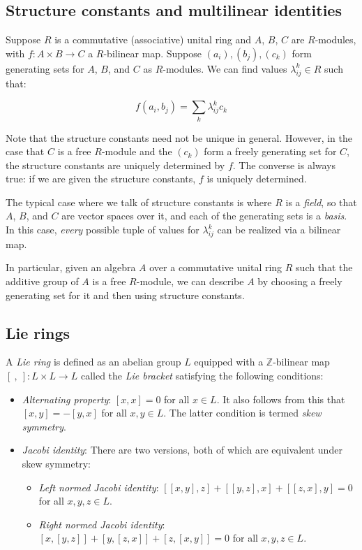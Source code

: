 \documentclass{ucetd}
\begin{document}
\subsection{Structure constants and multilinear identities}

Suppose $R$ is a commutative (associative) unital ring and $A$, $B$,
$C$ are $R$-modules, with $f:A \times B \to C$ a $R$-bilinear
map. Suppose $(a_i), (b_j),(c_k)$ form generating sets for $A$, $B$,
and $C$ as $R$-modules. We can find values $\lambda_{ij}^k \in R$ such that:

$$f(a_i,b_j) = \sum_k \lambda_{ij}^k c_k$$

Note that the structure constants need not be unique in
general. However, in the case that $C$ is a free $R$-module and the
$(c_k)$ form a freely generating set for $C$, the structure constants
are uniquely determined by $f$. The converse is always true: if we are
given the structure constants, $f$ is uniquely determined.

The typical case where we talk of structure constants is where $R$ is
a {\em field}, so that $A$, $B$, and $C$ are vector spaces over it,
and each of the generating sets is a {\em basis}. In this case, {\em
  every} possible tuple of values for $\lambda_{ij}^k$ can be realized
via a bilinear map.

In particular, given an algebra $A$ over a commutative unital ring $R$
such that the additive group of $A$ is a free $R$-module, we can
describe $A$ by choosing a freely generating set for it and then using
structure constants.

\subsection{Lie rings}\label{appsec:Lie}

A {\em Lie ring} is defined as an abelian group $L$ equipped with a
$\mathbb{Z}$-bilinear map $[ \ , \ ]:L \times L \to L$ called the {\em
  Lie bracket} satisfying the following conditions:

\begin{itemize}
\item {\em Alternating property}: $[x,x] = 0$ for all $x \in L$. It
  also follows from this that $[x,y] = -[y,x]$ for all $x,y \in
  L$. The latter condition is termed {\em skew symmetry}.
\item {\em Jacobi identity}: There are two versions, both of which are
  equivalent under skew symmetry:
  \begin{itemize}
  \item {\em Left normed Jacobi identity}: $[[x,y],z] + [[y,z],x] +
    [[z,x],y] = 0$ for all $x,y,z \in L$.
  \item {\em Right normed Jacobi identity}: $[x,[y,z]] + [y,[z,x]] +
    [z,[x,y]] = 0$ for all $x,y,z \in L$.
  \end{itemize}
\end{itemize}
\end{document}
